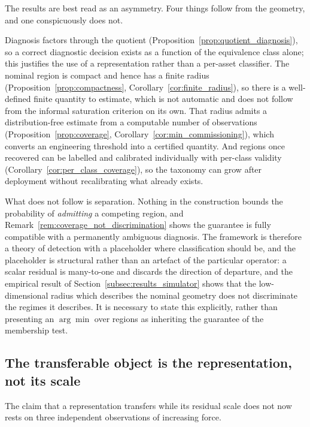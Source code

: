 \documentclass[a4paper]{cas-sc}
\begin{document}
The results are best read as an asymmetry. Four things follow from the
geometry, and one conspicuously does not.

Diagnosis factors through the quotient
(Proposition~\ref{prop:quotient_diagnosis}), so a correct diagnostic decision
exists as a function of the equivalence class alone; this justifies
the use of a representation rather than a per-asset classifier. The
nominal region is compact and hence has a finite radius
(Proposition~\ref{prop:compactness},
Corollary~\ref{cor:finite_radius}), so there is a well-defined finite quantity
to estimate, which is not automatic and does not follow from the informal
saturation criterion on its own. That radius admits a distribution-free
estimate from a computable number of observations
(Proposition~\ref{prop:coverage},
Corollary~\ref{cor:min_commissioning}), which converts an engineering
threshold into a certified quantity. And regions once recovered can be
labelled and calibrated individually with per-class validity
(Corollary~\ref{cor:per_class_coverage}), so the taxonomy can grow after
deployment without recalibrating what already exists.

What does not follow is separation. Nothing in the construction bounds the
probability of \emph{admitting} a competing region, and
Remark~\ref{rem:coverage_not_discrimination} shows the guarantee is fully
compatible with a permanently ambiguous diagnosis. The framework is therefore
a theory of detection with a placeholder where classification should be, and
the placeholder is structural rather than an artefact of the particular
operator: a scalar residual is many-to-one and discards the direction of
departure, and the empirical result of
Section~\ref{subsec:results_simulator} shows that the low-dimensional radius
which describes the nominal geometry does not discriminate the regimes it
describes. It is necessary to state this explicitly, rather than presenting an
\(\arg\min\) over regions as inheriting the guarantee of the membership test.

\subsection{The transferable object is the representation, not its scale}
\label{subsec:disc_scale}

The claim that a representation transfers while its residual scale does not
now rests on three independent observations of increasing force.
\end{document}
